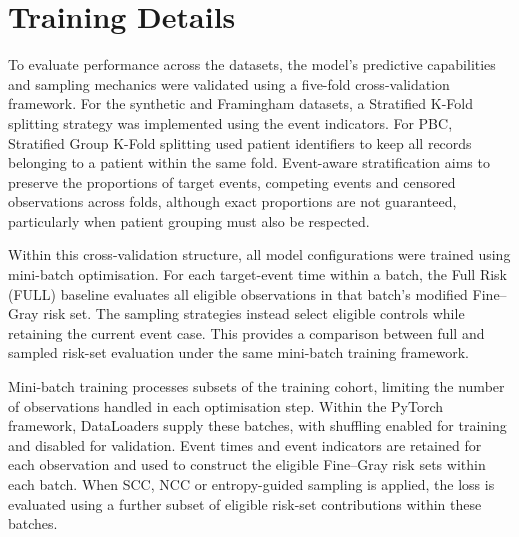 \documentclass[a4paper,twoside,12pt]{report}
\begin{document}



\section{Training Details}

To evaluate performance across the datasets, the model's predictive capabilities and sampling mechanics were validated using a five-fold cross-validation framework. For the synthetic and Framingham datasets, a Stratified K-Fold splitting strategy was implemented using the event indicators. For PBC, Stratified Group K-Fold splitting used patient identifiers to keep all records belonging to a patient within the same fold. Event-aware stratification aims to preserve the proportions of target events, competing events and censored observations across folds, although exact proportions are not guaranteed, particularly when patient grouping must also be respected.

Within this cross-validation structure, all model configurations were trained using mini-batch optimisation. For each target-event time within a batch, the Full Risk (FULL) baseline evaluates all eligible observations in that batch's modified Fine--Gray risk set. The sampling strategies instead select eligible controls while retaining the current event case. This provides a comparison between full and sampled risk-set evaluation under the same mini-batch training framework.

Mini-batch training processes subsets of the training cohort, limiting the number of observations handled in each optimisation step. Within the PyTorch framework, DataLoaders supply these batches, with shuffling enabled for training and disabled for validation. Event times and event indicators are retained for each observation and used to construct the eligible Fine--Gray risk sets within each batch. When SCC, NCC or entropy-guided sampling is applied, the loss is evaluated using a further subset of eligible risk-set contributions within these batches.
\end{document}

